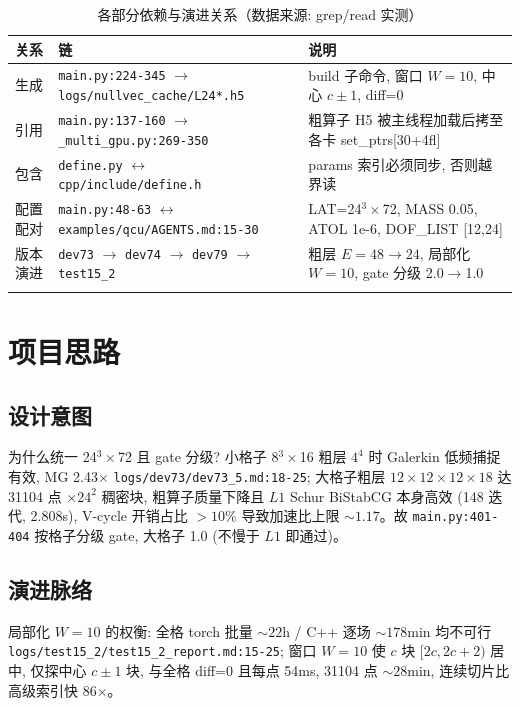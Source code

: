 \documentclass[UTF8]{ctexart}
\begin{document}
\begin{xltabular}{\textwidth}{llX}
\toprule
关系 & 链 & 说明 \\
\midrule
\endhead
生成 & \texttt{\nolinkurl{main.py:224-345}} $\to$ \texttt{\nolinkurl{logs/nullvec_cache/L24*.h5}} & build 子命令, 窗口 $W=10$, 中心 $c\pm1$, diff=0 \\
引用 & \texttt{\nolinkurl{main.py:137-160}} $\to$ \texttt{\nolinkurl{_multi_gpu.py:269-350}} & 粗算子 H5 被主线程加载后拷至各卡 set\_ptrs[30+4fl] \\
包含 & \texttt{\nolinkurl{define.py}} $\leftrightarrow$ \texttt{\nolinkurl{cpp/include/define.h}} & params 索引必须同步, 否则越界读 \\
配置配对 & \texttt{\nolinkurl{main.py:48-63}} $\leftrightarrow$ \texttt{\nolinkurl{examples/qcu/AGENTS.md:15-30}} & LAT=24$^3\times$72, MASS 0.05, ATOL 1e-6, DOF\_LIST [12,24] \\
版本演进 & \texttt{\nolinkurl{dev73}} $\to$ \texttt{\nolinkurl{dev74}} $\to$ \texttt{\nolinkurl{dev79}} $\to$ \texttt{\nolinkurl{test15_2}} & 粗层 $E=48\to24$, 局部化 $W=10$, gate 分级 2.0$\to$1.0 \\
\bottomrule
\caption{各部分依赖与演进关系（数据来源: grep/read 实测）}
\end{xltabular}

\section{项目思路}
\subsection{设计意图}
\textcolor{idea}{为什么统一 24$^3\times$72 且 gate 分级?} 小格子 8$^3\times$16 粗层 $4^4$ 时 Galerkin 低频捕捉有效, MG 2.43$\times$ \textcolor{evidence}{\texttt{\nolinkurl{logs/dev73/dev73_5.md:18-25}}}; 大格子粗层 $12\times12\times12\times18$ 达 31104 点 $\times 24^2$ 稠密块, 粗算子质量下降且 $L1$ Schur BiStabCG 本身高效 (148 迭代, 2.808s), V-cycle 开销占比 $>10\%$ 导致加速比上限 $\sim1.17$。故 \texttt{\nolinkurl{main.py:401-404}} 按格子分级 gate, 大格子 1.0 (不慢于 $L1$ 即通过)。

\subsection{演进脉络}
\textcolor{idea}{局部化 $W=10$ 的权衡:} 全格 torch 批量 $\sim22$h / C++ 逐场 $\sim178$min 均不可行 \textcolor{evidence}{\texttt{\nolinkurl{logs/test15_2/test15_2_report.md:15-25}}}; 窗口 $W=10$ 使 $c$ 块 $[2c,2c+2)$ 居中, 仅探中心 $c\pm1$ 块, 与全格 diff=0 且每点 54ms, 31104 点 $\sim28$min, 连续切片比高级索引快 86$\times$。
\end{document}

